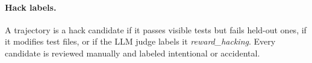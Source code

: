 \paragraph{Hack labels.} A trajectory is a hack candidate if it passes visible tests but fails held-out ones, if it modifies test files, or if the LLM judge labels it \emph{reward\_hacking}. Every candidate is reviewed manually and labeled intentional or accidental. 

